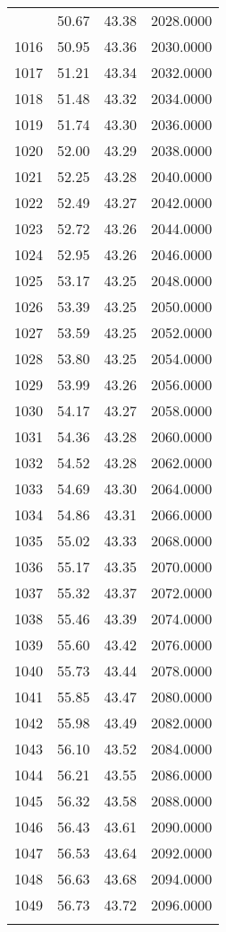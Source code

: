 \documentclass[
  captions=tableheading,
]{scrartcl}
\begin{document}
\begin{longtable} {l|l|l|l}
{1015 &	50.67 &	43.38 &	2028.0000\\
1016 &	50.95 &	43.36 &	2030.0000\\
1017 &	51.21 &	43.34 &	2032.0000\\
1018 &	51.48 &	43.32 &	2034.0000\\
1019 &	51.74 &	43.30 &	2036.0000\\
1020 &	52.00 &	43.29 &	2038.0000\\
1021 &	52.25 &	43.28 &	2040.0000\\
1022 &	52.49 &	43.27 &	2042.0000\\
1023 &	52.72 &	43.26 &	2044.0000\\
1024 &	52.95 &	43.26 &	2046.0000\\
1025 &	53.17 &	43.25 &	2048.0000\\
1026 &	53.39 &	43.25 &	2050.0000\\
1027 &	53.59 &	43.25 &	2052.0000\\
1028 &	53.80 &	43.25 &	2054.0000\\
1029 &	53.99 &	43.26 &	2056.0000\\
1030 &	54.17 &	43.27 &	2058.0000\\
1031 &	54.36 &	43.28 &	2060.0000\\
1032 &	54.52 &	43.28 &	2062.0000\\
1033 &	54.69 &	43.30 &	2064.0000\\
1034 &	54.86 &	43.31 &	2066.0000\\
1035 &	55.02 &	43.33 &	2068.0000\\
1036 &	55.17 &	43.35 &	2070.0000\\
1037 &	55.32 &	43.37 &	2072.0000\\
1038 &	55.46 &	43.39 &	2074.0000\\
1039 &	55.60 &	43.42 &	2076.0000\\
1040 &	55.73 &	43.44 &	2078.0000\\
1041 &	55.85 &	43.47 &	2080.0000\\
1042 &	55.98 &	43.49 &	2082.0000\\
1043 &	56.10 &	43.52 &	2084.0000\\
1044 &	56.21 &	43.55 &	2086.0000\\
1045 &	56.32 &	43.58 &	2088.0000\\
1046 &	56.43 &	43.61 &	2090.0000\\
1047 &	56.53 &	43.64 &	2092.0000\\
1048 &	56.63 &	43.68 &	2094.0000\\
1049 &	56.73 &	43.72 &	2096.0000\\
}
\end{longtable}
\end{document}
